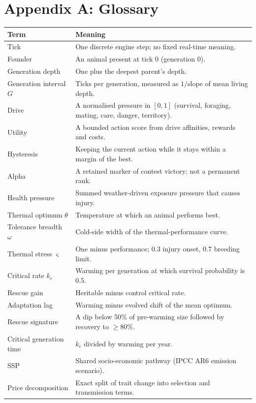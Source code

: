 \chapter*{Appendix A: Glossary}
\begin{longtable}{p{3.8cm}p{11.2cm}}
\toprule
Term & Meaning \\
\midrule
\endfirsthead
Tick & One discrete engine step; no fixed real-time meaning. \\
Founder & An animal present at tick 0 (generation 0). \\
Generation depth & One plus the deepest parent's depth. \\
Generation interval $G$ & Ticks per generation, measured as $1/$slope of mean living depth. \\
Drive & A normalised pressure in $[0,1]$ (survival, foraging, mating, care, danger, territory). \\
Utility & A bounded action score from drive affinities, rewards and costs. \\
Hysteresis & Keeping the current action while it stays within a margin of the best. \\
Alpha & A retained marker of contest victory; not a permanent rank. \\
Health pressure & Summed weather-driven exposure pressure that causes injury. \\
Thermal optimum $\theta$ & Temperature at which an animal performs best. \\
Tolerance breadth $\omega$ & Cold-side width of the thermal-performance curve. \\
Thermal stress $\varsigma$ & One minus performance; 0.3 injury onset, 0.7 breeding limit. \\
Critical rate $k_c$ & Warming per generation at which survival probability is 0.5. \\
Rescue gain & Heritable minus control critical rate. \\
Adaptation lag & Warming minus evolved shift of the mean optimum. \\
Rescue signature & A dip below 50\% of pre-warming size followed by recovery to $\ge80\%$. \\
Critical generation time & $k_c$ divided by warming per year. \\
SSP & Shared socio-economic pathway (IPCC AR6 emission scenario). \\
Price decomposition & Exact split of trait change into selection and transmission terms. \\

\end{longtable}
